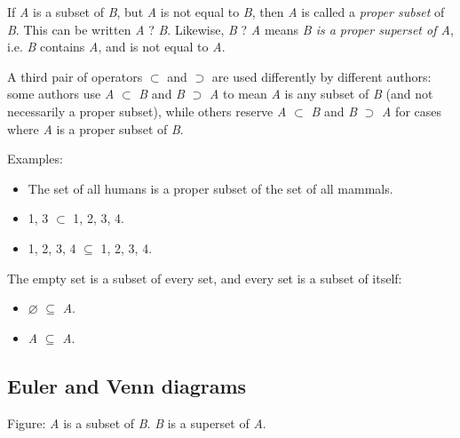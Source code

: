 If \textit{A} is a subset of \textit{B}, but \textit{A} is not equal to \textit{B}, then
\textit{A} is called a \textit{proper subset} of \textit{B}. This can be written
\textit{A} ? \textit{B}. Likewise, \textit{B} ? \textit{A} means \textit{B is a proper
superset of A}, i.e. \textit{B} contains \textit{A}, and is not equal to \textit{A}.



A third pair of operators $\subset$ and $\supset$ are used differently by different
authors: some authors use \textit{A} $\subset$ \textit{B} and \textit{B} $\supset$
\textit{A} to mean \textit{A} is any subset of \textit{B} (and not necessarily a proper
subset), while others reserve \textit{A} $\subset$ \textit{B} and \textit{B} $\supset$
\textit{A} for cases where \textit{A} is a proper subset of \textit{B}.



Examples:



\begin{itemize}
    \item The set of all humans is a proper subset of the set of all mammals.
    \item {1, 3} $\subset$ {1, 2, 3, 4}.
    \item {1, 2, 3, 4} $\subseteq$ {1, 2, 3, 4}.
\end{itemize}

The empty set is a subset of every set, and every set is a subset of itself:



\begin{itemize}
    \item $\varnothing$ $\subseteq$ \textit{A}.
    \item \textit{A} $\subseteq$ \textit{A}.
\end{itemize}


\subsection{Euler and Venn diagrams}
\label{sss:eule-12f8}







Figure: \textit{A} is a subset of \textit{B}. \textit{B} is a superset of \textit{A}.



